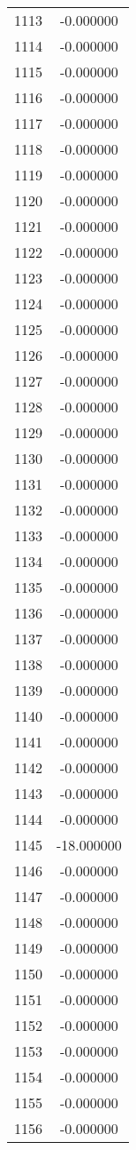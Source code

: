 \documentclass[12pt]{article}
\begin{document}
\begin{longtable}{@{}cc@{}}
1113 & -0.000000 \\
1114 & -0.000000 \\
1115 & -0.000000 \\
1116 & -0.000000 \\
1117 & -0.000000 \\
1118 & -0.000000 \\
1119 & -0.000000 \\
1120 & -0.000000 \\
1121 & -0.000000 \\
1122 & -0.000000 \\
1123 & -0.000000 \\
1124 & -0.000000 \\
1125 & -0.000000 \\
1126 & -0.000000 \\
1127 & -0.000000 \\
1128 & -0.000000 \\
1129 & -0.000000 \\
1130 & -0.000000 \\
1131 & -0.000000 \\
1132 & -0.000000 \\
1133 & -0.000000 \\
1134 & -0.000000 \\
1135 & -0.000000 \\
1136 & -0.000000 \\
1137 & -0.000000 \\
1138 & -0.000000 \\
1139 & -0.000000 \\
1140 & -0.000000 \\
1141 & -0.000000 \\
1142 & -0.000000 \\
1143 & -0.000000 \\
1144 & -0.000000 \\
1145 & -18.000000 \\
1146 & -0.000000 \\
1147 & -0.000000 \\
1148 & -0.000000 \\
1149 & -0.000000 \\
1150 & -0.000000 \\
1151 & -0.000000 \\
1152 & -0.000000 \\
1153 & -0.000000 \\
1154 & -0.000000 \\
1155 & -0.000000 \\
1156 & -0.000000 \\

\end{longtable}
\end{document}
